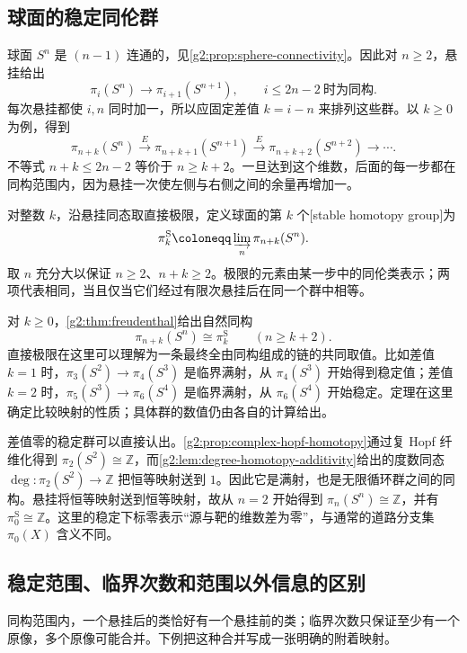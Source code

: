 \subsection{球面的稳定同伦群}
\label{g2:subsec:0905:04}
球面 \(S^n\) 是 \((n-1)\) 连通的，见\cref{g2:prop:sphere-connectivity}。因此对 \(n\ge2\)，悬挂给出
\[
	\pi_i(S^n)\longrightarrow\pi_{i+1}(S^{n+1}),
	\qquad i\le2n-2\ \text{时为同构}.
\]
每次悬挂都使 \(i,n\) 同时加一，所以应固定差值 \(k=i-n\) 来排列这些群。以 \(k\ge0\) 为例，得到
\[
	\pi_{n+k}(S^n)\xrightarrow{E}\pi_{n+k+1}(S^{n+1})\xrightarrow{E}\pi_{n+k+2}(S^{n+2})\longrightarrow\cdots.
\]
不等式 \(n+k\le2n-2\) 等价于 \(n\ge k+2\)。一旦达到这个维数，后面的每一步都在同构范围内，因为悬挂一次使左侧与右侧之间的余量再增加一。

\begin{definition}[球面的稳定同伦群]\label{g2:def:stable-sphere-homotopy}
	对整数 \(k\)，沿悬挂同态取直接极限，定义球面的第 \(k\) 个[stable homotopy group]为
	\[
		\pi_k^{\mathrm S}\coloneqq\varinjlim_{n}\pi_{n+k}(S^n).
	\]
	取 \(n\) 充分大以保证 \(n\ge2\)、\(n+k\ge2\)。极限的元素由某一步中的同伦类表示；两项代表相同，当且仅当它们经过有限次悬挂后在同一个群中相等。
\end{definition}

对 \(k\ge0\)，\cref{g2:thm:freudenthal}给出自然同构
\[
	\pi_{n+k}(S^n)\cong\pi_k^{\mathrm S}\qquad(n\ge k+2).
\]
直接极限在这里可以理解为一条最终全由同构组成的链的共同取值。比如差值 \(k=1\) 时，\(\pi_3(S^2)\rightarrow\pi_4(S^3)\) 是临界满射，从 \(\pi_4(S^3)\) 开始得到稳定值；差值 \(k=2\) 时，\(\pi_5(S^3)\rightarrow\pi_6(S^4)\) 是临界满射，从 \(\pi_6(S^4)\) 开始稳定。定理在这里确定比较映射的性质；具体群的数值仍由各自的计算给出。

\ProseParagraphBreak
差值零的稳定群可以直接认出。\cref{g2:prop:complex-hopf-homotopy}通过复 Hopf 纤维化得到 \(\pi_2(S^2)\cong\mathbb Z\)，而\cref{g2:lem:degree-homotopy-additivity}给出的度数同态 \(\deg:\pi_2(S^2)\rightarrow\mathbb Z\) 把恒等映射送到 \(1\)。因此它是满射，也是无限循环群之间的同构。悬挂将恒等映射送到恒等映射，故从 \(n=2\) 开始得到 \(\pi_n(S^n)\cong\mathbb Z\)，并有 \(\pi_0^{\mathrm S}\cong\mathbb Z\)。这里的稳定下标零表示“源与靶的维数差为零”，与通常的道路分支集 \(\pi_0(X)\) 含义不同。

\subsection{稳定范围、临界次数和范围以外信息的区别}
\label{g2:subsec:0905:05}
同构范围内，一个悬挂后的类恰好有一个悬挂前的类；临界次数只保证至少有一个原像，多个原像可能合并。下例把这种合并写成一张明确的附着映射。

